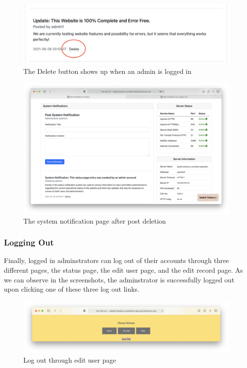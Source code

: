 \documentclass[12pt, letterpaper]{article}
\begin{document}
\begin{figure}[htbp]
\centering
\includegraphics[width=\textwidth]{images/30-journey-a06a.png}
\caption{The Delete button shows up when an admin is logged in}
\end{figure}

\begin{figure}[htbp]
\centering
\includegraphics[width=5in]{images/30-journey-a06b.png}
\caption{The system notification page after post deletion}
\end{figure}

\newpage
\subsubsection*{Logging Out}
Finally, logged in adminstrators can log out of their accounts through three different pages, the status page, the edit user page, and the edit record page. As we can observe in the screenshots, the adminstrator is successfully logged out upon clicking one of these three log out links.

\begin{figure}[htbp]
\centering
\includegraphics[width=\textwidth]{images/30-journey-a07a.png}
\caption{Log out through edit user page}
\end{figure}
\end{document}
